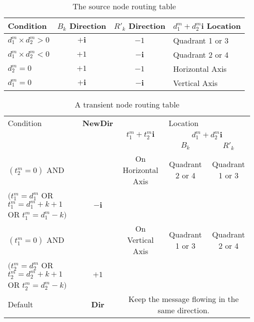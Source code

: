 \documentclass[12pt,journal,compsoc,onecolumn,]{IEEEtran}
\begin{document}
{\begin{table}
\centering
{\footnotesize
\begin{tabular}
[c]{|l|l|l|l|}\hline
Condition & $B_k$ Direction & $R'_k$ Direction & $d_{1}^{m}+d_{2}^{m}\mathbf{i}$ Location\\\hline
$d_{1}^{m}\times d_{2}^{m}>0$ & \multicolumn{1}{|c|}{$+\mathbf{i}$} &
\multicolumn{1}{|c|}{$-1$} & Quadrant 1 or 3\\\hline
$d_{1}^{m}\times d_{2}^{m}<0$ & \multicolumn{1}{|c|}{$+1$} &
\multicolumn{1}{|c|}{$-\mathbf{i}$} & Quadrant 2 or 4\\\hline
$d_{2}^{m}=0$ & \multicolumn{1}{|c|}{$+1$} & \multicolumn{1}{|c|}{$-1$} &
Horizontal Axis\\\hline
$d_{1}^{m}=0$ & \multicolumn{1}{|c|}{$+\mathbf{i}$} &
\multicolumn{1}{|c|}{$-\mathbf{i}$} & Vertical Axis\\\hline
\end{tabular}
}\caption{The source node routing table}
\label{SourceRoutBlackRed}
\end{table}
 \begin{table}
\centering
{\footnotesize \begin{tabular}
[c]{|l|l|c|cc|}\hline
Condition & \textbf{NewDir} & \multicolumn{3}{|c|}{Location}\\
\cline{3-5}
&  & $t_{1}^{m}+t_{2}^{m}\mathbf{i}$ & \multicolumn{2}{|c|}{$d_{1}^{m}+d_{2}^{m}\mathbf{i}$}\\
\cline{4-5}
&  &  & $B_k$ & \multicolumn{1}{|c|}{$R'_k$} \\
\hline
$(  t_{2}^{m}=0)$  AND &  & On Horizontal  Axis & Quadrant 2 or
4 & \multicolumn{1}{|c|}{Quadrant 1 or 3}\\
$(  t_{1}^{m}=d_{1}^{m}$ OR $t_{1}^{m}=d_{1}^{m}+k+1$ OR $t_{1}^{m}=d_{1}^{m}-k)  $ &
\multicolumn{1}{|c|}{$-\mathbf{i}$} &  &  & \multicolumn{1}{|c|}{}\\\hline
$\left(  t_{1}^{m}=0\right)$ AND & \multicolumn{1}{|c|}{} & On Vertical
Axis & Quadrant 1 or 3 & \multicolumn{1}{|c|}{Quadrant 2 or 4}\\
$(  t_{2}^{m}=d_{2}^{m}$ OR $t_{2}^{m}=d_{2}^{m}+k+1$ OR
$t_{2}^{m}=d_{2}^{m}-k)  $ & \multicolumn{1}{|c|}{$+1$} &  &  &
\multicolumn{1}{|c|}{}\\\hline
Default & \multicolumn{1}{|c|}{\textbf{Dir}} & \multicolumn{3}{|c|}{
Keep the message flowing in the same direction.}\\\hline
\end{tabular}
}\caption{A transient node routing table}
\label{TransRoutBlackRed}
\end{table}
 
}
\end{document}
